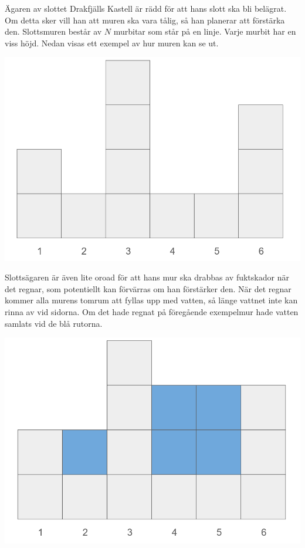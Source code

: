 
\noindent

Ägaren av slottet Drakfjälls Kastell är rädd för att hans slott ska bli belägrat. Om detta sker vill
han att muren ska vara tålig, så han planerar att förstärka den. Slottsmuren består av $N$ murbitar
som står på en linje. Varje murbit har en viss höjd. Nedan visas ett exempel av hur muren kan se ut.

\begin{center}
  \includegraphics[scale=0.3]{mur1.png}
\end{center}

Slottsägaren är även lite oroad för att hans mur ska drabbas av fuktskador när det regnar, som potentiellt
kan förvärras om han förstärker den. När det
regnar kommer alla murens tomrum att fyllas upp med vatten, så länge vattnet inte kan rinna av
vid sidorna. Om det hade regnat på föregående exempelmur hade vatten samlats vid de blå rutorna.

\begin{center}
  \includegraphics[scale=0.3]{mur2.png}
\end{center}

